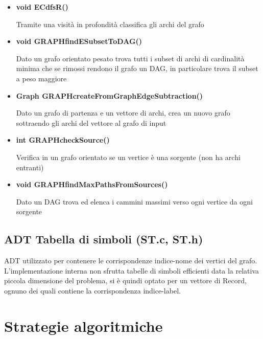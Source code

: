 \documentclass[11pt, a4paper, titlepage]{article}
\begin{document}
            \begin{itemize}
                \item \textbf{void ECdfsR()} 
                
                Tramite una visità in profondità classifica gli archi del grafo

                \item \textbf{void GRAPHfindESubsetToDAG()}
                
                Dato un grafo orientato pesato trova tutti i subset di archi di cardinalità minima che se rimossi rendono il grafo un DAG, in particolare trova il subset a peso maggiore

                \item \textbf{Graph GRAPHcreateFromGraphEdgeSubtraction()}
                
                Dato un grafo di partenza e un vettore di archi, crea un nuovo grafo sottraendo gli archi del vettore al grafo di input

                \item \textbf{int GRAPHcheckSource()}
                
                Verifica in un grafo orientato se un vertice è una sorgente (non ha archi entranti)

                \item \textbf{void GRAPHfindMaxPathsFromSources()}
                
                Dato un DAG trova ed elenca i cammini massimi verso ogni vertice da ogni sorgente

            \end{itemize}

        \subsection{ADT Tabella di simboli (ST.c, ST.h)}
            ADT utilizzato per contenere le corrispondenze indice-nome dei vertici del grafo. L'implementazione interna non sfrutta tabelle
            di simboli efficienti data la relativa piccola dimensione del problema, si è quindi optato per un vettore di Record, ognuno dei quali contiene la corrispondenza indice-label.

    \section{Strategie algoritmiche}
\end{document}
